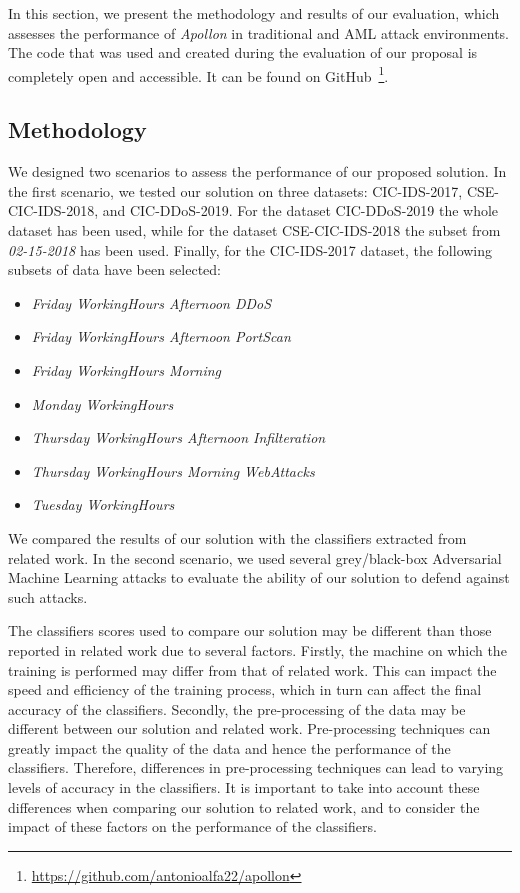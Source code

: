 In this section, we present the methodology and results of our evaluation, which assesses the performance of \textit{Apollon} in
traditional and AML attack environments.
The code that was used and created during the evaluation of our proposal is completely open and accessible.
It can be found on GitHub~\footnote{\url{https://github.com/antonioalfa22/apollon}}.


\subsection{Methodology}\label{subsec:methodology}
We designed two scenarios to assess the performance of our proposed solution.
In the first scenario, we tested our solution on three datasets: CIC-IDS-2017, CSE-CIC-IDS-2018, and CIC-DDoS-2019.
For the dataset CIC-DDoS-2019 the whole dataset has been used, while for the dataset CSE-CIC-IDS-2018 the subset
from \textit{02-15-2018} has been used.
Finally, for the CIC-IDS-2017 dataset, the following subsets of data have been selected:

\begin{itemize}
    \item \textit{Friday WorkingHours Afternoon DDoS}
    \item \textit{Friday WorkingHours Afternoon PortScan}
    \item \textit{Friday WorkingHours Morning}
    \item \textit{Monday WorkingHours}
    \item \textit{Thursday WorkingHours Afternoon Infilteration}
    \item \textit{Thursday WorkingHours Morning WebAttacks}
    \item \textit{Tuesday WorkingHours}
\end{itemize}

We compared the results of our solution with the classifiers extracted from related work.
In the second scenario, we used several grey/black-box Adversarial Machine Learning attacks to evaluate the ability of
our solution to defend against such attacks.

The classifiers scores used to compare our solution may be different than those reported in related work due to several
factors.
Firstly, the machine on which the training is performed may differ from that of related work.
This can impact the speed and efficiency of the training process, which in turn can affect the final accuracy of the
classifiers.
Secondly, the pre-processing of the data may be different between our solution and related work.
Pre-processing techniques can greatly impact the quality of the data and hence the performance of the classifiers.
Therefore, differences in pre-processing techniques can lead to varying levels of accuracy in the classifiers.
It is important to take into account these differences when comparing our solution to related work, and to consider
the impact of these factors on the performance of the classifiers.

